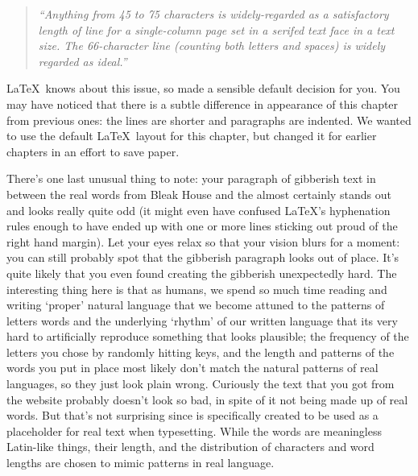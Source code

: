 \begin{refsection}
\begin{quote}
\emph{
``Anything from 45 to 75 characters is widely-regarded as a satisfactory length of line for a single-column page set in a serifed text face in a text size. The 66-character line (counting both letters and spaces) is widely regarded as ideal.''}
\end{quote}

\LaTeX\ knows about this issue, so made a sensible default decision for you. You may have noticed that there is a subtle difference in appearance of this chapter from previous ones: the lines are shorter and paragraphs are indented. We wanted to use the default \LaTeX\ layout for this chapter, but changed it for earlier chapters in an effort to save paper.

There's one last unusual thing to note: your paragraph of gibberish text in between the real words from Bleak House and the  almost certainly stands out and looks really quite odd (it might even have confused \LaTeX's hyphenation rules enough to have ended up with one or more lines sticking out proud of the right hand margin).  Let your eyes relax so that your vision blurs for a moment: you can still probably spot that the gibberish paragraph looks out of place. It's quite likely that you even found creating the gibberish unexpectedly hard. The interesting thing here is that as humans, we spend so much time reading and writing `proper' natural language that we become attuned to the patterns of letters words and the underlying `rhythm' of our written language that its very hard to artificially reproduce something that looks plausible; the frequency of the letters you chose by randomly hitting keys, and the length and patterns of the words you put in place most likely don't match the natural patterns of real languages, so they just look plain wrong.  Curiously the  text that you got from the website probably doesn't look so bad, in spite of it not being made up of real words. But that's not surprising since  is specifically created to be used as a placeholder for real text when typesetting. While the words are meaningless Latin-like things, their length, and the distribution of characters and word lengths are chosen to mimic patterns in real language.



\end{refsection}
